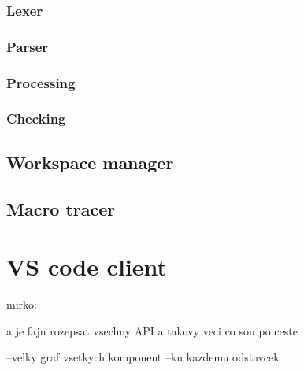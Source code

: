 \subsubsection{Lexer}
\subsubsection{Parser}
\subsubsection{Processing}
\subsubsection{Checking}


\subsection{Workspace manager}









\subsection{Macro tracer}



\section{VS code client}

mirko:

a je fajn rozepsat vsechny API a takovy veci co sou po ceste

--velky graf vsetkych komponent
--ku kazdemu odstavcek 